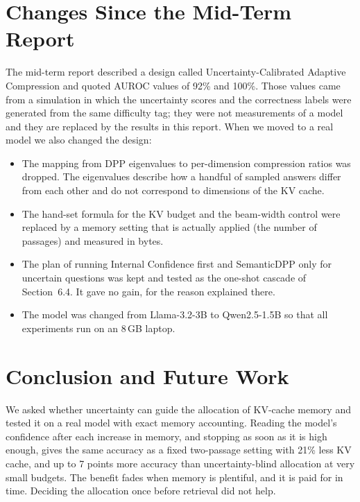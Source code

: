 \documentclass[11pt,a4paper]{article}
\begin{document}
\section{Changes Since the Mid-Term Report}

The mid-term report described a design called Uncertainty-Calibrated Adaptive
Compression and quoted AUROC values of 92\% and 100\%. Those values came from a
simulation in which the uncertainty scores and the correctness labels were
generated from the same difficulty tag; they were not measurements of a model
and they are replaced by the results in this report. When we moved to a real
model we also changed the design:
\begin{itemize}
\item The mapping from DPP eigenvalues to per-dimension compression ratios was
dropped. The eigenvalues describe how a handful of sampled answers differ from
each other and do not correspond to dimensions of the KV cache.
\item The hand-set formula for the KV budget and the beam-width control were
replaced by a memory setting that is actually applied (the number of passages)
and measured in bytes.
\item The plan of running Internal Confidence first and SemanticDPP only for
uncertain questions was kept and tested as the one-shot cascade of Section~6.4.
It gave no gain, for the reason explained there.
\item The model was changed from Llama-3.2-3B to Qwen2.5-1.5B so that all
experiments run on an 8\,GB laptop.
\end{itemize}

\section{Conclusion and Future Work}

We asked whether uncertainty can guide the allocation of KV-cache memory and
tested it on a real model with exact memory accounting. Reading the model's
confidence after each increase in memory, and stopping as soon as it is high
enough, gives the same accuracy as a fixed two-passage setting with 21\% less
KV cache, and up to 7 points more accuracy than uncertainty-blind allocation at
very small budgets. The benefit fades when memory is plentiful, and it is paid
for in time. Deciding the allocation once before retrieval did not help.
\end{document}
